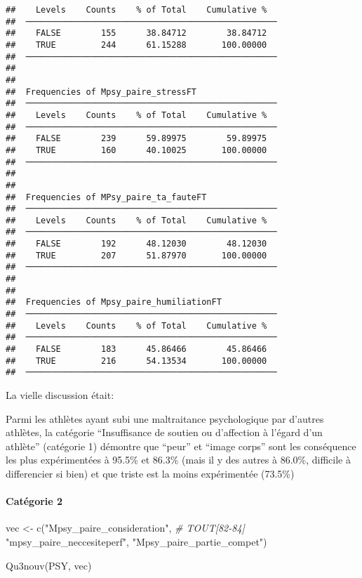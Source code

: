 \documentclass[
]{article}
\newenvironment{Shaded}{\begin{snugshade}}{\end{snugshade}}
\newcommand{\CommentTok}[1]{\textcolor[rgb]{0.56,0.35,0.01}{\textit{#1}}}
\newcommand{\FunctionTok}[1]{\textcolor[rgb]{0.00,0.00,0.00}{#1}}
\newcommand{\NormalTok}[1]{#1}
\newcommand{\OtherTok}[1]{\textcolor[rgb]{0.56,0.35,0.01}{#1}}
\newcommand{\StringTok}[1]{\textcolor[rgb]{0.31,0.60,0.02}{#1}}
\begin{document}
\begin{verbatim}
##    Levels    Counts    % of Total    Cumulative %   
##  ────────────────────────────────────────────────── 
##    FALSE        155      38.84712        38.84712   
##    TRUE         244      61.15288       100.00000   
##  ────────────────────────────────────────────────── 
## 
## 
##  Frequencies of Mpsy_paire_stressFT                 
##  ────────────────────────────────────────────────── 
##    Levels    Counts    % of Total    Cumulative %   
##  ────────────────────────────────────────────────── 
##    FALSE        239      59.89975        59.89975   
##    TRUE         160      40.10025       100.00000   
##  ────────────────────────────────────────────────── 
## 
## 
##  Frequencies of MPsy_paire_ta_fauteFT               
##  ────────────────────────────────────────────────── 
##    Levels    Counts    % of Total    Cumulative %   
##  ────────────────────────────────────────────────── 
##    FALSE        192      48.12030        48.12030   
##    TRUE         207      51.87970       100.00000   
##  ────────────────────────────────────────────────── 
## 
## 
##  Frequencies of Mpsy_paire_humiliationFT            
##  ────────────────────────────────────────────────── 
##    Levels    Counts    % of Total    Cumulative %   
##  ────────────────────────────────────────────────── 
##    FALSE        183      45.86466        45.86466   
##    TRUE         216      54.13534       100.00000   
##  ──────────────────────────────────────────────────
\end{verbatim}

La vielle discussion était:

Parmi les athlètes ayant subi une maltraitance psychologique par
d'autres athlètes, la catégorie ``Insuffisance de soutien ou d'affection
à l'égard d'un athlète'' (catégorie 1) démontre que ``peur'' et ``image
corps'' sont les conséquence les plus expérimentées à 95.5\% et 86.3\%
(mais il y des autres à 86.0\%, difficile à differencier si bien) et que
triste est la moins expérimentée (73.5\%)

\hypertarget{catuxe9gorie-2}{%
\paragraph{Catégorie 2}\label{catuxe9gorie-2}}

\begin{Shaded}
\begin{Highlighting}[]
\NormalTok{vec }\OtherTok{\textless{}{-}} \FunctionTok{c}\NormalTok{(}\StringTok{"Mpsy\_paire\_consideration"}\NormalTok{,  }\CommentTok{\# TOUT[82{-}84]}
    \StringTok{"mpsy\_paire\_neccesiteperf"}\NormalTok{,}
    \StringTok{"Mpsy\_paire\_partie\_compet"}\NormalTok{)}

\FunctionTok{Qu3nouv}\NormalTok{(PSY, vec)}
\end{Highlighting}
\end{Shaded}
\end{document}
